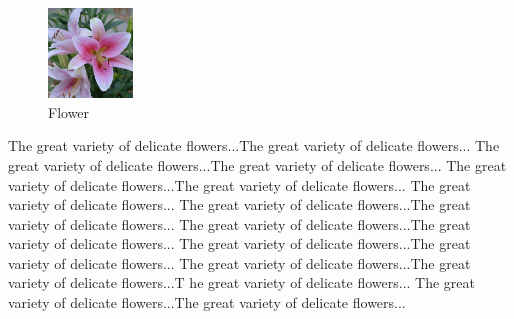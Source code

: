 \documentclass[preview, border=1pt, varwidth]{standalone}
\begin{document}
\begin{figure} %
    \centering
    \includegraphics[width=0.2\textwidth]{lilies.jpg}

    \caption{Flower}
\end{figure}

The great variety of delicate flowers...The great variety of delicate flowers...
The great variety of delicate flowers...The great variety of delicate flowers...
The great variety of delicate flowers...The great variety of delicate flowers...
The great variety of delicate flowers...
The great variety of delicate flowers...The great variety of delicate flowers...
The great variety of delicate flowers...The great variety of delicate flowers...
The great variety of delicate flowers...The great variety of delicate flowers...
The great variety of delicate flowers...The great variety of delicate flowers...T
he great variety of delicate flowers...
The great variety of delicate flowers...The great variety of delicate flowers...
\end{document}
